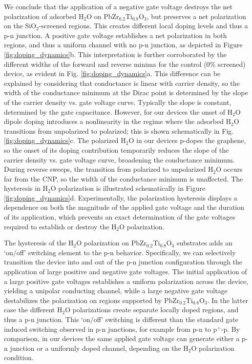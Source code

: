 \documentclass[edeposit,fullpage,draftthesis]{uiucthesis2009}
\begin{document}
        We conclude that the application of a negative gate voltage destroys the net polarization of adsorbed H$_2$O on PbZr$_{0.2}$Ti$_{0.8}$O$_3$, but preserves a net polarization on the SiO$_2$-screened regions. This creates different local doping levels and thus a p-n junction. A positive gate voltage establishes a net polarization in both regions, and thus a uniform channel with no p-n junction, as depicted in Figure \ref{fig:doping_dynamics}b. This interpretation is further corroborated by the different widths of the forward and reverse minima for the control (0\% screened) device, as evident in Fig. \ref{fig:doping_dynamics}a. This difference can be explained by considering that conductance is linear with carrier density\cite{Hwang2007}, so the width of the conductance minimum at the Dirac point is determined by the slope of the carrier density vs. gate voltage curve. Typically the slope is constant, determined by the gate capacitance. However, for our devices the onset of H$_2$O dipole doping introduces a nonlinearity in the regime where the adsorbed H$_2$O transitions from unpolarized to polarized; this is shown schematically in Fig. \ref{fig:doping_dynamics}c. The polarized H$_2$O in our devices p-dopes the graphene, so the onset of its doping contribution temporarily reduces the slope of the carrier density vs. gate voltage curve, broadening the conductance minimum. During reverse sweeps, the transition from polarized to unpolarized H$_2$O occurs far from the CNP, so the width of the conductance minimum is unaffected. The hysteresis in H$_2$O polarization is illustrated schematically in Figure \ref{fig:doping_dynamics}d. Experimentally, the polarization hysteresis displays a dependence on both the magnitude of the applied gate voltage and the duration of its application, which prevents an exact determination of the gate voltages required to establish or destroy the H$_2$O polarization.

        The hysteresis of the H$_2$O polarization on PbZr$_{0.2}$Ti$_{0.8}$O$_3$ substrates adds an `on/off' switching element to the p-n behavior. Specifically, we can selectively transition the device into and out of the p-n junction configuration through the application of large positive and negative gate voltages. The initial application of a large positive gate voltages establishes a uniform polarization across the device, yielding a unipolar conducting channel, while a large negative gate voltage destabilizes the polarization on regions supported by PbZr$_{0.2}$Ti$_{0.8}$O$_3$. In the latter case the different H$_2$O polarizations create separate locally doped regions, and thus a p-n junction. This `on/off' switching is different than the standard gate induced switching observed in p-n junctions, for example from p-n to p$^+$-p. By comparison, in our devices the same applied gate voltage can generate either a p-n junction or a uniformly doped channel, depending on the H$_2$O polarization condition.
\end{document}
